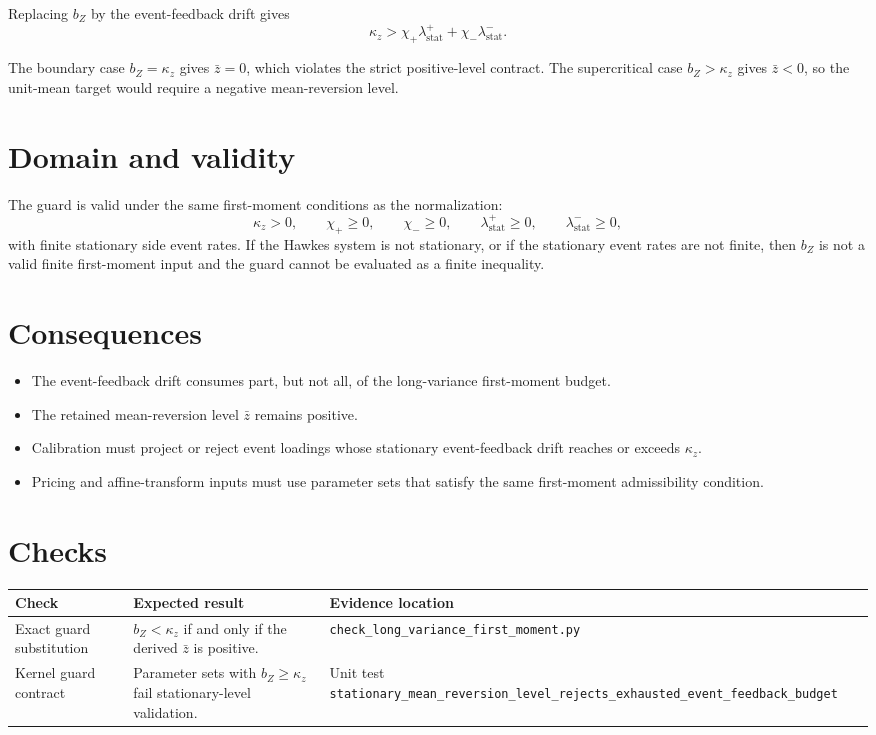 \documentclass[11pt]{article}
\begin{document}
Replacing \(b_Z\) by the event-feedback drift gives
\[
    \kappa_z
    >
    \chi_+\lambda_{\mathrm{stat}}^+
    +\chi_-\lambda_{\mathrm{stat}}^-.
\]

The boundary case \(b_Z=\kappa_z\) gives \(\bar z=0\), which violates the
strict positive-level contract.
The supercritical case \(b_Z>\kappa_z\) gives \(\bar z<0\), so the unit-mean
target would require a negative mean-reversion level.

\section{Domain and validity}

The guard is valid under the same first-moment conditions as the normalization:
\[
    \kappa_z>0,\qquad
    \chi_+\ge 0,\qquad
    \chi_-\ge 0,\qquad
    \lambda_{\mathrm{stat}}^+\ge 0,\qquad
    \lambda_{\mathrm{stat}}^-\ge 0,
\]
with finite stationary side event rates.
If the Hawkes system is not stationary, or if the stationary event rates are
not finite, then \(b_Z\) is not a valid finite first-moment input and the guard
cannot be evaluated as a finite inequality.

\section{Consequences}

\begin{itemize}
    \item The event-feedback drift consumes part, but not all, of the long-variance first-moment budget.
    \item The retained mean-reversion level \(\bar z\) remains positive.
    \item Calibration must project or reject event loadings whose stationary event-feedback drift reaches or exceeds \(\kappa_z\).
    \item Pricing and affine-transform inputs must use parameter sets that satisfy the same first-moment admissibility condition.
\end{itemize}

\section{Checks}

\begin{tabularx}{\textwidth}{XXX}
\toprule
Check & Expected result & Evidence location\\
\midrule
Exact guard substitution
& \(b_Z<\kappa_z\) if and only if the derived \(\bar z\) is positive.
& \texttt{check\_long\_variance\_first\_moment.py}\\
Kernel guard contract
& Parameter sets with \(b_Z\ge\kappa_z\) fail stationary-level validation.
& Unit test \texttt{stationary\_mean\_reversion\_level\_rejects\_exhausted\_event\_feedback\_budget}\\
\bottomrule
\end{tabularx}
\end{document}
